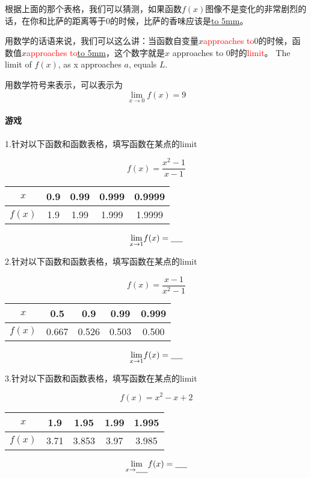\documentclass[UTF8]{ctexart}
\begin{document}
根据上面的那个表格，我们可以猜测，如果函数$f(x)$图像不是变化的非常剧烈的话，在你和比萨的距离等于0的时候，比萨的香味应该是\underline{\hbox to 5mm{}}。

用数学的话语来说，我们可以这么讲：当函数自变量$x$\textcolor{red}{approaches to}0的时候，函数值$x$\textcolor{red}{approaches to}\underline{\hbox to 5mm{}}，这个数字就是$x$ approaches to 0时的\textcolor{red}{limit}。
The limit of $f(x)$, as x approaches $a$, equals $L$.

用数学符号来表示，可以表示为\[{\lim_{x\to 0}} f(x) = 9\]

\paragraph{游戏}
1.针对以下函数和函数表格，填写函数在某点的limit

\[f(x) = \frac{x^2-1}{x-1}\]
\begin{center}
\begin{tabular}{c|c|c|c|c}
\hline
$x$  & 0.9 & 0.99 & 0.999& 0.9999 \\
\hline
$f(x)$ & 1.9 & 1.99 & 1.999 & 1.9999\\
\hline
\end{tabular}
\end{center}
\[{\lim_{x\to 1}} f(x) = \underline{\hbox to 5mm{}}\]


2.针对以下函数和函数表格，填写函数在某点的limit

\[f(x) = \frac{x-1}{x^2-1}\]
\begin{center}
\begin{tabular}{c|c|c|c|c}
\hline
$x$  & 0.5 & 0.9 & 0.99& 0.999 \\
\hline
$f(x)$ & 0.667 & 0.526 & 0.503 & 0.500\\
\hline
\end{tabular}
\end{center}
\[{\lim_{x\to 1}} f(x) = \underline{\hbox to 5mm{}}\]

3.针对以下函数和函数表格，填写函数在某点的limit

\[f(x) = x^2-x+2\]
\begin{center}
\begin{tabular}{c|c|c|c|c}
\hline
$x$  & 1.9 & 1.95 & 1.99& 1.995 \\
\hline
$f(x)$ & 3.71 & 3.853 & 3.97 & 3.985\\
\hline
\end{tabular}
\end{center}
\[{\lim_{x\to \underline{\hbox to 5mm{}}}} f(x) = \underline{\hbox to 5mm{}}\]
\end{document}
